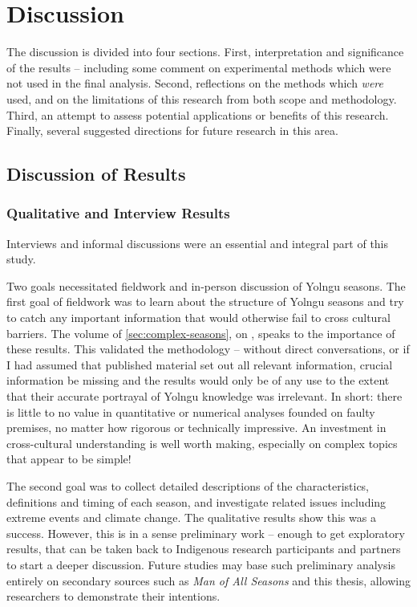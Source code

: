 \chapter{Discussion}
\label{ch:discussion}

The discussion is divided into four sections.  First, interpretation and
significance of the results -- including some comment on experimental methods
which were not used in the final analysis.  Second, reflections on the methods
which \emph{were} used, and on the limitations of this research from both
scope and methodology.  Third, an attempt to assess potential applications or
benefits of this research.  Finally, several suggested directions for future
research in this area.



\section{Discussion of Results}
\label{sec:disc-results}

\subsection{Qualitative and Interview Results}

Interviews and informal discussions were an essential and integral part of
this study.

Two goals necessitated fieldwork and in-person discussion of Yolngu seasons.
The first goal of fieldwork  was to learn about the structure of Yolngu
seasons and try to catch any important information that would otherwise
fail to cross cultural barriers.  The volume of \cref{sec:complex-seasons},
on \textit{}, speaks to the importance of these
results.
%
This validated the methodology -- without direct conversations, or if I had
assumed that published material set out all relevant information, crucial
information be missing and the results would only be of any use to the extent
that their accurate portrayal of Yolngu knowledge was irrelevant.
%
In short: there is little to no value in quantitative or numerical analyses
founded on faulty premises, no matter how rigorous or technically impressive.
An investment in cross-cultural understanding is well worth making, especially
on complex topics that appear to be simple!

The second goal was to collect detailed descriptions of the characteristics,
definitions and timing of each season, and investigate related issues
including extreme events and climate change.  The qualitative results
show this was a success.  However, this is in a sense preliminary work --
enough to get exploratory results, that can be taken back to Indigenous
research participants and partners to start a deeper discussion.  Future
studies may base such preliminary analysis entirely on secondary sources
such as \textit{Man of All Seasons} \citep{davis1989} and this thesis,
allowing researchers to demonstrate their intentions.


